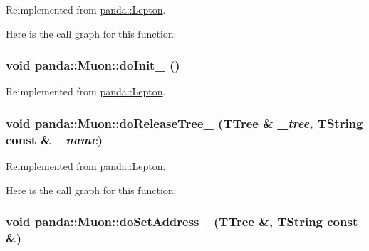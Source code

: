 Reimplemented from \hyperlink{classpanda_1_1Lepton_a90a170df4cd09d324964da724bcc5428}{panda::Lepton}.

Here is the call graph for this function:\hypertarget{classpanda_1_1Muon_a50a228225667669a6fa827d426740e70}{
\subsubsection[{doInit\_\-}]{\setlength{\rightskip}{0pt plus 5cm}void panda::Muon::doInit\_\- ()}}
\label{classpanda_1_1Muon_a50a228225667669a6fa827d426740e70}


Reimplemented from \hyperlink{classpanda_1_1Lepton_af764ff1ea6dfb16072d6c9de3b935129}{panda::Lepton}.\hypertarget{classpanda_1_1Muon_ab6aedf6cd1f1714f4cd3b315cee18c8d}{
\subsubsection[{doReleaseTree\_\-}]{\setlength{\rightskip}{0pt plus 5cm}void panda::Muon::doReleaseTree\_\- (TTree \& {\em \_\-tree}, \/  TString const \& {\em \_\-name})}}
\label{classpanda_1_1Muon_ab6aedf6cd1f1714f4cd3b315cee18c8d}


Reimplemented from \hyperlink{classpanda_1_1Lepton_ae0f913947dcc9e3827de846e7b885280}{panda::Lepton}.

Here is the call graph for this function:\hypertarget{classpanda_1_1Muon_a7488d95aaa9e9a79bda6d90b8967a52b}{
\subsubsection[{doSetAddress\_\-}]{\setlength{\rightskip}{0pt plus 5cm}void panda::Muon::doSetAddress\_\- (TTree \&, \/  TString const \&)}}
\label{classpanda_1_1Muon_a7488d95aaa9e9a79bda6d90b8967a52b}


